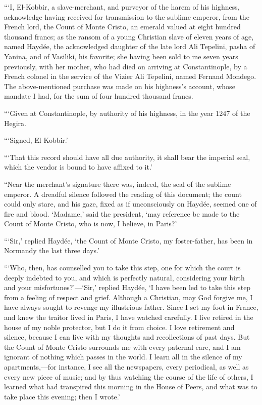 “‘I, El-Kobbir, a slave-merchant, and purveyor of the harem of his
highness, acknowledge having received for transmission to the sublime
emperor, from the French lord, the Count of Monte Cristo, an emerald
valued at eight hundred thousand francs; as the ransom of a young
Christian slave of eleven years of age, named Haydée, the acknowledged
daughter of the late lord Ali Tepelini, pasha of Yanina, and of
Vasiliki, his favorite; she having been sold to me seven years
previously, with her mother, who had died on arriving at
Constantinople, by a French colonel in the service of the Vizier Ali
Tepelini, named Fernand Mondego. The above-mentioned purchase was made
on his highness’s account, whose mandate I had, for the sum of four
hundred thousand francs.

“‘Given at Constantinople, by authority of his highness, in the year
1247 of the Hegira.

“‘Signed, El-Kobbir.’

“‘That this record should have all due authority, it shall bear the
imperial seal, which the vendor is bound to have affixed to it.’

“Near the merchant’s signature there was, indeed, the seal of the
sublime emperor. A dreadful silence followed the reading of this
document; the count could only stare, and his gaze, fixed as if
unconsciously on Haydée, seemed one of fire and blood. ‘Madame,’ said
the president, ‘may reference be made to the Count of Monte Cristo, who
is now, I believe, in Paris?’

“‘Sir,’ replied Haydée, ‘the Count of Monte Cristo, my foster-father,
has been in Normandy the last three days.’

“‘Who, then, has counselled you to take this step, one for which the
court is deeply indebted to you, and which is perfectly natural,
considering your birth and your misfortunes?’—‘Sir,’ replied Haydée, ‘I
have been led to take this step from a feeling of respect and grief.
Although a Christian, may God forgive me, I have always sought to
revenge my illustrious father. Since I set my foot in France, and knew
the traitor lived in Paris, I have watched carefully. I live retired in
the house of my noble protector, but I do it from choice. I love
retirement and silence, because I can live with my thoughts and
recollections of past days. But the Count of Monte Cristo surrounds me
with every paternal care, and I am ignorant of nothing which passes in
the world. I learn all in the silence of my apartments,—for instance, I
see all the newspapers, every periodical, as well as every new piece of
music; and by thus watching the course of the life of others, I learned
what had transpired this morning in the House of Peers, and what was to
take place this evening; then I wrote.’

